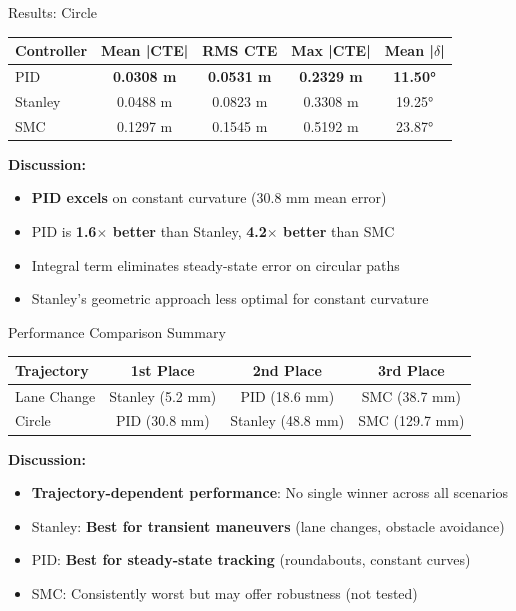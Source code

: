 \documentclass[10pt]{beamer}
\begin{document}
\begin{frame}{Results: Circle}
  \begin{table}
    \centering
    \small
    \begin{tabular}{lcccc}
      \toprule
      \textbf{Controller} & \textbf{Mean |CTE|} & \textbf{RMS CTE} & \textbf{Max |CTE|} & \textbf{Mean |$\delta$|} \\
      \midrule
      PID     & \textbf{0.0308 m} & \textbf{0.0531 m} & \textbf{0.2329 m} & \textbf{11.50°} \\
      Stanley & 0.0488 m & 0.0823 m & 0.3308 m & 19.25° \\
      SMC     & 0.1297 m & 0.1545 m & 0.5192 m & 23.87° \\
      \bottomrule
    \end{tabular}
  \end{table}

  \vspace{0.3cm}

  \textbf{Discussion:}
  \begin{itemize}
    \item \textbf{PID excels} on constant curvature (30.8 mm mean error)
    \item PID is \textbf{1.6$\times$ better} than Stanley, \textbf{4.2$\times$ better} than SMC
    \item Integral term eliminates steady-state error on circular paths
    \item Stanley's geometric approach less optimal for constant curvature
  \end{itemize}
\end{frame}


\begin{frame}{Performance Comparison Summary}
  \begin{table}
    \centering
    \small
    \begin{tabular}{lccc}
      \toprule
      \textbf{Trajectory} & \textbf{1st Place} & \textbf{2nd Place} & \textbf{3rd Place} \\
      \midrule
      Lane Change & Stanley (5.2 mm) & PID (18.6 mm) & SMC (38.7 mm) \\
      Circle      & PID (30.8 mm) & Stanley (48.8 mm) & SMC (129.7 mm) \\
      \bottomrule
    \end{tabular}
  \end{table}

  \vspace{0.3cm}

  \textbf{Discussion:}
  \begin{itemize}
    \item \textbf{Trajectory-dependent performance}: No single winner across all scenarios
    \item Stanley: \textbf{Best for transient maneuvers} (lane changes, obstacle avoidance)
    \item PID: \textbf{Best for steady-state tracking} (roundabouts, constant curves)
    \item SMC: Consistently worst but may offer robustness (not tested)
  \end{itemize}
\end{frame}
\end{document}
